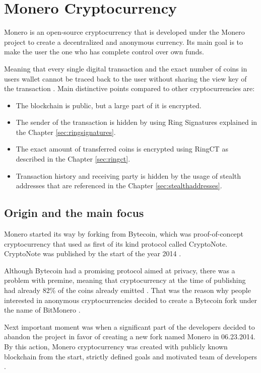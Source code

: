 \documentclass[
  printed, %
  table,   %
  nolof,     %
  nolot,     %
           oneside, color
]{fithesis3}
\begin{document}
\chapter{Monero Cryptocurrency}
Monero is an open-source cryptocurrency that is developed under the Monero project to create a decentralized and anonymous currency. Its main goal is to make the user the one who has complete control over own funds.

Meaning that every single digital transaction and the exact number of coins in users wallet cannot be traced back to the user without sharing the view key of the transaction \cite{moneroprojectgithub}. Main distinctive points compared to other cryptocurrencies are:

\begin{itemize}\itemsep0em
\item The blockchain is public, but a large part of it is encrypted.
\item The sender of the transaction is hidden by using Ring Signatures explained in the Chapter \ref{sec:ringsignatures}.
\item The exact amount of transferred coins is encrypted using RingCT as described in the Chapter \ref{sec:ringct}.
\item Transaction history and receiving party is hidden by the usage of stealth addresses that are referenced in the Chapter \ref{sec:stealthaddresses}.
\end{itemize}

\section{Origin and the main focus}
Monero started its way by forking from Bytecoin, which was proof-of-concept cryptocurrency that used as first of its kind protocol called CryptoNote. CryptoNote was published by the start of the year 2014 \cite{githubbytecoin}.

Although Bytecoin had a promising protocol aimed at privacy, there was a problem with premine, meaning that cryptocurrency at the time of publishing had already 82\% of the coins already emitted \cite{fluffyponyonbytecoin}. That was the reason why people interested in anonymous cryptocurrencies decided to create a Bytecoin fork under the name of BitMonero \cite{bitmonero}. 

Next important moment was when a significant part of the developers decided to abandon the project in favor of creating a new fork named Monero in 06.23.2014. By this action, Monero cryptocurrency was created with publicly known blockchain from the start, strictly defined goals and motivated team of developers \cite{monerofork}.
\end{document}
